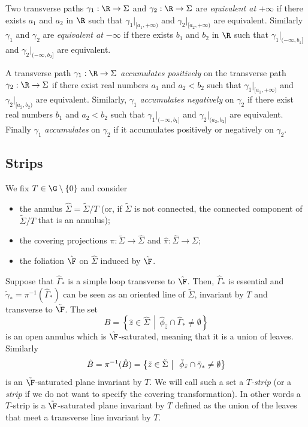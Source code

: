 Two transverse paths $\gamma_1:\R\to \Sigma$ and $\gamma_2:\R\to \Sigma$ are \emph{equivalent at $+\infty$} if there exists $a_1$ and $a_2$ in $\R$ such that $\gamma_1{}|_{[a_1,+\infty)}$ and $\gamma_2{}|_{[a_2,+\infty)}$ are equivalent. Similarly $\gamma_1$ and $\gamma_2$ are \emph{equivalent at $-\infty$} if there exists $b_1$ and $b_2$ in $\R$ such that $\gamma_1{}|_{(-\infty,b_1]}$ and $\gamma_2{}|_{(-\infty,b_2]}$ are equivalent.


A transverse path $\gamma_1:\R\to \Sigma$ \emph{accumulates positively} on the transverse path $\gamma_2:\R\to \Sigma$ if there exist real numbers $a_1$ and $a_2<b_2$ such that $\gamma_1{}|_{[a_1,+\infty)}$ and $\gamma_2{}|_{[a_2,b_2)}$ are equivalent. Similarly, $\gamma_1$ \emph{accumulates negatively} on $\gamma_2$ if there exist real numbers $b_1$ and $a_2<b_2$ such that $\gamma_1{}|_{(-\infty,b_1]}$ and $\gamma_2{}|_{(a_2,b_2]}$ are equivalent. Finally $\gamma_1$ \emph{accumulates} on $\gamma_2$ if it accumulates positively or negatively on $\gamma_2$.


\subsection{Strips} \label{ss:strips}

We fix $T\in {\G}\setminus\{0\}$ and consider
\begin{itemize}
\item the annulus $\hat\Sigma=\tilde\Sigma/T$ (or, if $\tilde\Sigma$ is not connected, the connected component of $\tilde\Sigma/T$ that is an annulus);
\item the covering projections $\pi: \tilde\Sigma\to \hat\Sigma$ and $\hat\pi: \hat\Sigma\to \Sigma$;
\item the foliation $\hat{\F}$ on $\hat{\Sigma}$ induced by $\tilde{\F}$.
\end{itemize}
Suppose that $\hat\Gamma_*$ is a simple loop transverse to $\hat{\F}$. Then, $\hat\Gamma_*$ is essential and $\tilde\gamma_*=\pi^{-1}(\hat\Gamma_*)$ can be seen as an oriented line of $\tilde \Sigma$, invariant by $T$ and transverse to $\tilde{\F}$. The set
\[
\hat B=\left\{\hat z \in \hat\Sigma \,\middle| \,\hat \phi_{\hat z} \cap \hat\Gamma_*\not=\emptyset\right\}
\]
is an open annulus which is $\hat{\F}$-saturated, meaning that it is a union of leaves. Similarly
\[
\tilde B=\pi^{-1}(\hat B)=\left\{\tilde z \in \tilde\Sigma\,\,\middle| \,\enskip \tilde\phi_{\tilde z} \cap \tilde\gamma_*\not=\emptyset\right\}
\]
is an $\tilde{\F}$-saturated plane invariant by $T$. We will call such a set a \emph{$T$-strip} (or a \emph{strip} if we do not want to specify the covering transformation). In other words a $T$-strip is a $\tilde{\F}$-saturated plane invariant by $T$ defined as the union of the leaves that meet a transverse line invariant by $T$.

